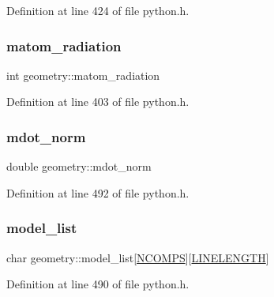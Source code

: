 Definition at line 424 of file python.\+h.

\mbox{\label{structgeometry_a4b97dc16b54fd49d53a06ff8896596a6}} 
\subsubsection{\texorpdfstring{matom\+\_\+radiation}{matom\_radiation}}
{\footnotesize\ttfamily int geometry\+::matom\+\_\+radiation}



Definition at line 403 of file python.\+h.

\mbox{\label{structgeometry_a68afc43b64c264eab0386bb00e931ad6}} 
\subsubsection{\texorpdfstring{mdot\+\_\+norm}{mdot\_norm}}
{\footnotesize\ttfamily double geometry\+::mdot\+\_\+norm}



Definition at line 492 of file python.\+h.

\mbox{\label{structgeometry_a0fa9b4b736998442e6971b5ed75f102d}} 
\subsubsection{\texorpdfstring{model\+\_\+list}{model\_list}}
{\footnotesize\ttfamily char geometry\+::model\+\_\+list\mbox{[}\hyperlink{python_8h_a060fae9f08d64907d8eb54a79e2defa8}{N\+C\+O\+M\+PS}\mbox{]}\mbox{[}\hyperlink{xlog_8c_a10e8c7b8458375c3dbfbb4010a2aba8c}{L\+I\+N\+E\+L\+E\+N\+G\+TH}\mbox{]}}



Definition at line 490 of file python.\+h.

\mbox{\label{structgeometry_a0a526c9353a39b2f27f1edfdcb808384}} 
